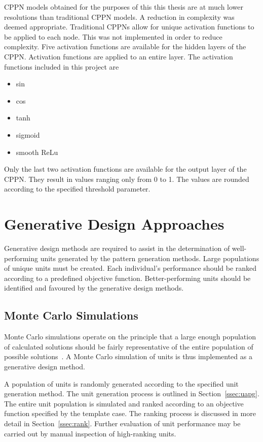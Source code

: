 CPPN models obtained for the purposes of this this thesis are at much lower resolutions than traditional CPPN models. A reduction in complexity was deemed appropriate. Traditional CPPNs allow for unique activation functions to be applied to each node. This was not implemented in order to reduce complexity. Five activation functions are available for the hidden layers of the CPPN. Activation functions are applied to an entire layer. The activation functions included in this project are

\begin{itemize}
	\item sin
	\item cos
	\item tanh
	\item sigmoid
	\item smooth ReLu
\end{itemize}

Only the last two activation functions are available for the output layer of the CPPN. They result in values ranging only from 0 to 1. The values are rounded according to the specified threshold parameter.

\section{Generative Design Approaches}
\label{sec:GD}

Generative design methods are required to assist in the determination of well-performing units generated by the pattern generation methods. Large populations of unique units must be created. Each individual's performance should be ranked according to a predefined objective function. Better-performing units should be identified and favoured by the generative design methods.

\subsection{Monte Carlo Simulations}

Monte Carlo simulations operate on the principle that a large enough population of calculated solutions should be fairly representative of the entire population of possible solutions~\citep{Metropolis1949}. A Monte Carlo simulation of units is thus implemented as a generative design method.

A population of units is randomly generated according to the specified unit generation method. The unit generation process is outlined in Section~\ref{ssec:uapg}. The entire unit population is simulated and ranked according to an objective function specified by the template case. The ranking process is discussed in more detail in Section~\ref{ssec:rank}. Further evaluation of unit performance may be carried out by manual inspection of high-ranking units.

